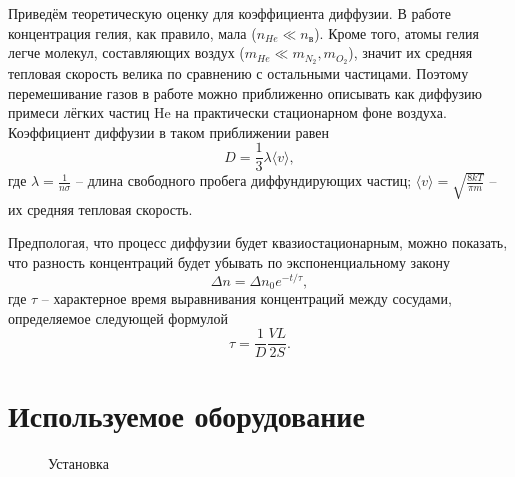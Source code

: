 \documentclass[a4paper,12pt]{article} %
\begin{document}
Приведём теоретическую оценку для коэффициента диффузии. В работе концентрация гелия, как правило, мала ($n_{He} \ll n_{в}$). Кроме того, атомы гелия легче молекул, составляющих воздух ($m_{He} \ll m_{N_2}, m_{O_2}$), значит их средняя тепловая скорость велика по сравнению с остальными частицами. Поэтому перемешивание газов в работе можно приближенно описывать как диффузию примеси лёгких частиц He на практически стационарном фоне воздуха. Коэффициент диффузии в таком приближении равен
\begin{equation}
    \label{D}
    D = \frac{1}{3} \lambda \langle v \rangle,
\end{equation}
где $\lambda = \frac{1}{n\sigma}$ -- длина свободного пробега диффундирующих частиц; $\langle v \rangle = \sqrt{\frac{8kT}{\pi m}}$ -- их средняя тепловая скорость.

Предпологая, что процесс диффузии будет квазиостационарным, можно показать, что разность концентраций будет убывать по экспоненциальному закону
\begin{equation}
    \label{Delta_n}
    \Delta n = \Delta n_0 e^{-t / \tau},
\end{equation}
где $\tau$ -- характерное время выравнивания концентраций между сосудами, определяемое следующей формулой
\begin{equation}
    \label{Tau}
    \tau = \frac{1}{D} \frac{VL}{2S}.
\end{equation}

\section{Используемое оборудование}

\begin{figure}[h]
    \caption{Установка}
    \label{установка}
\end{figure}
\end{document}
